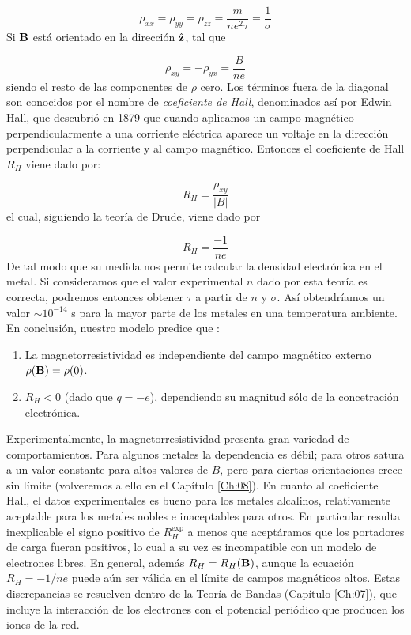 \begin{equation}
	\rho_{xx} = \rho_{yy} = \rho_{zz} = \frac{m}{ne^2 \tau} = \frac{1}{\sigma}
\end{equation}
Si $\mathbf{B}$ está orientado en la dirección $\hat{\mathbf{z}}$, tal que 

\begin{equation}
	\rho_{xy} = - \rho_{yx} = \frac{B}{ne}
\end{equation}
siendo el resto de las componentes de $\rho$ cero. Los términos fuera de la diagonal son conocidos por el nombre de \textit{coeficiente de Hall}, denominados así por Edwin Hall, que descubrió en 1879 que cuando aplicamos un campo magnético perpendicularmente a una corriente eléctrica aparece un voltaje en la dirección perpendicular a la corriente y al campo magnético. Entonces el coeficiente de Hall $R_H$ viene dado por:

\begin{equation}
	R_H = \frac{\rho_{xy}}{|B|}
\end{equation}
el cual, siguiendo la teoría de Drude, viene dado por

\begin{equation}
	R_H = \frac{-1}{ne}
\end{equation}
De tal modo que su medida nos permite calcular la densidad electrónica en el metal. Si consideramos que el valor experimental $n$ dado por esta teoría es correcta, podremos entonces obtener $\tau$ a partir de $n$ y $\sigma$. Así obtendríamos un valor $\sim 10^{-14}$ s para la mayor parte de los metales en una temperatura ambiente. En conclusión, nuestro modelo predice que :

\begin{enumerate}
	\item La magnetorresistividad es independiente del campo magnético externo $\rho(\mathbf{B})=\rho(0)$.
	\item $R_H<0$ (dado que $q=-e$), dependiendo su magnitud sólo de la concetración electrónica. 
\end{enumerate}
Experimentalmente, la magnetorresistividad presenta gran variedad de comportamientos. Para algunos metales la dependencia es débil; para otros satura a un valor constante para altos valores de $B$, pero para ciertas orientaciones crece sin límite (volveremos a ello en el Capítulo \ref{Ch:08}). En cuanto al coeficiente Hall, el datos experimentales es bueno para los metales alcalinos, relativamente aceptable para los metales nobles e inaceptables para otros. En particular resulta inexplicable el signo positivo de $R_H^{\text{exp}}$ a menos que aceptáramos que los portadores de carga fueran positivos, lo cual a su vez es incompatible con un modelo de electrones libres. En general, además $R_H = R_H (\mathbf{B})$, aunque la ecuación $R_H=-1/ne$ puede aún ser válida en el límite de campos magnéticos altos. Estas discrepancias se resuelven dentro de la Teoría de Bandas (Capítulo \ref{Ch:07}), que incluye la interacción de los electrones con el potencial periódico que producen los iones de la red.

